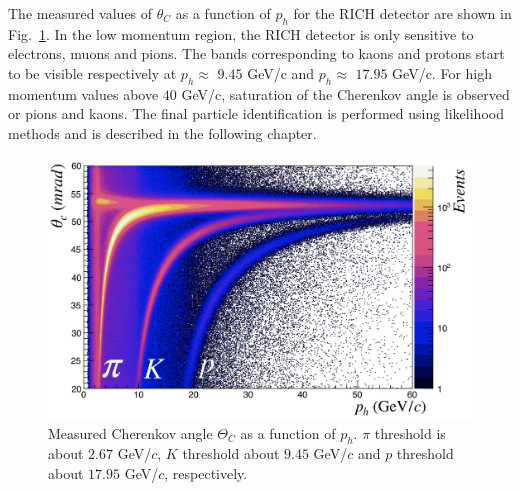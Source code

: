 The measured values of $\theta_C$ as a function of $p_h$ for the RICH detector are shown in Fig.~\ref{pic:RICH}. In the low momentum region, the RICH detector is only sensitive to electrons, muons and pions. The bands corresponding to kaons and protons start to be visible respectively at $p_h \approx$ $9.45$ GeV/c and $p_h \approx$ $17.95$ GeV/c. For high momentum values above $40$ GeV/c, saturation of the Cherenkov angle is observed or pions and kaons. The final particle identification is performed using likelihood methods and is described in the following chapter.

\begin{figure}[!h]
  \centering
	\includegraphics[scale=0.45]{./gfx/RICH.png}
	\caption{Measured Cherenkov angle $\Theta_C$ as a function of $p_h$. $\pi$ threshold is about $2.67$ GeV/$c$, $K$ threshold about $9.45$ GeV/$c$ and $p$ threshold about $17.95$ GeV/$c$, respectively.}
	\label{pic:RICH}
\end{figure}

